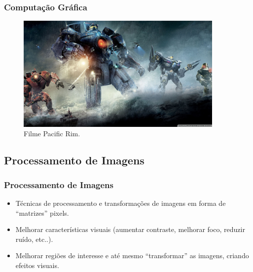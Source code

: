 \documentclass{beamer}
\begin{document}


\begin{frame}
\frametitle{Computação Gráfica}
	
	\begin{figure}[!h]
		\begin{center}
			\includegraphics[width=0.9\textwidth]{Figures/pr3}
			\caption{Filme Pacific Rim.}
		\end{center}
		
	\end{figure}
	

\end{frame}



\subsection{Processamento de Imagens}
\begin{frame}
\frametitle{Processamento de Imagens}

\begin{block}

		\begin{itemize}
			\item<1-> Técnicas de processamento e transformações de imagens em forma de ``matrizes'' pixels.
		\end{itemize}
\end{block}

\begin{block}

		\begin{itemize}
			\item Melhorar características visuais (aumentar contraste, melhorar foco, reduzir ruído, etc..).
			\item Melhorar regiões de interesse e até mesmo ``transformar'' as imagens, criando efeitos visuais.
		\end{itemize}
\end{block}

\end{frame}
\end{document}
